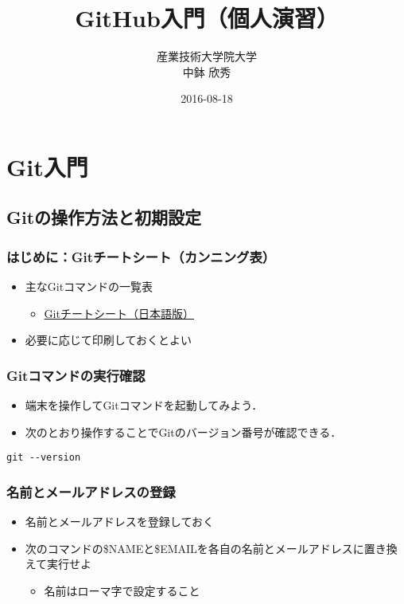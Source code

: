 \documentclass[a4paper,twoside,twocolumn]{bxjsarticle}
\author{産業技術大学院大学\\ 中鉢 欣秀}
\date{2016-08-18}
\title{GitHub入門（個人演習）}
\begin{document}
\maketitle

\section{Git入門}
\label{sec-1}
\subsection{Gitの操作方法と初期設定}
\label{sec-1-1}
\subsubsection{はじめに：Gitチートシート（カンニング表）}
\label{sec-1-1-1}
\begin{itemize}
\item 主なGitコマンドの一覧表
\begin{itemize}
\item \href{https://services.github.com/kit/downloads/ja/github-git-cheat-sheet.pdf}{Gitチートシート（日本語版）}
\end{itemize}
\item 必要に応じて印刷しておくとよい
\end{itemize}

\subsubsection{Gitコマンドの実行確認}
\label{sec-1-1-2}
\begin{itemize}
\item 端末を操作してGitコマンドを起動してみよう．
\item 次のとおり操作することでGitのバージョン番号が確認できる．
\end{itemize}

\begin{verbatim}
git --version
\end{verbatim}

\subsubsection{名前とメールアドレスの登録}
\label{sec-1-1-3}
\begin{itemize}
\item 名前とメールアドレスを登録しておく
\item 次のコマンドの\$NAMEと\$EMAILを各自の名前とメールアドレスに置き換えて実行せよ
\begin{itemize}
\item 名前はローマ字で設定すること
\end{itemize}
\end{itemize}
\end{document}
